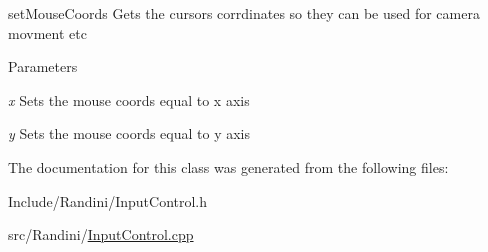 setMouseCoords Gets the cursors corrdinates so they can be used for camera movment etc 
\begin{DoxyParams}{Parameters}
\item[{\em x}]Sets the mouse coords equal to x axis \item[{\em y}]Sets the mouse coords equal to y axis \end{DoxyParams}


The documentation for this class was generated from the following files:\begin{DoxyCompactItemize}
\item 
Include/Randini/InputControl.h\item 
src/Randini/\hyperlink{InputControl_8cpp}{InputControl.cpp}\end{DoxyCompactItemize}
